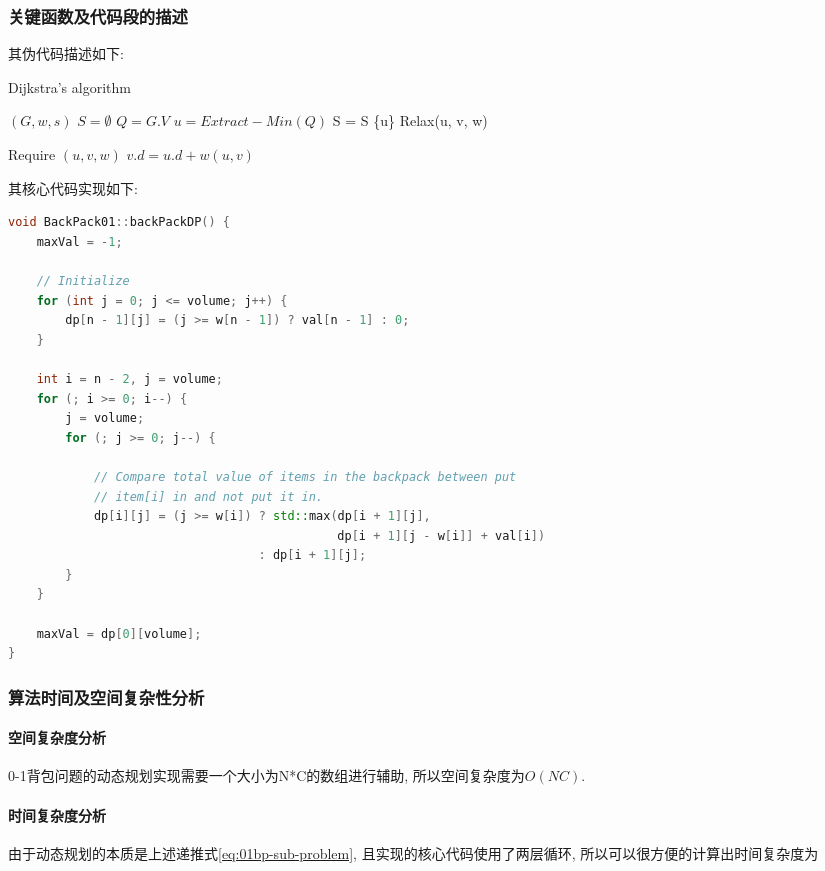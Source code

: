\subsubsection{关键函数及代码段的描述}
其伪代码描述如下:
\begin{algorithm}
	\caption{Dijkstra's algorithm}\label{alg:dijkstra}
	\begin{algorithmic}{1}
		\Require $(G, w, s)$
		\State $S = \emptyset$
		\State $Q = G.V$
		\State $u = Extract-Min(Q)$
		\State S = S \cup \{u\}
		\State Relax(u, v, w)
		\EndFor
		\EndWhile
	\end{algorithmic}

	\begin{algorithmic}{1}
		Require $(u, v, w)$
		\State $v.d = u.d + w(u, v)$
		\EndIf
	\end{algorithmic}
\end{algorithm}

其核心代码实现如下:

\begin{lstlisting}[language=c++]
void BackPack01::backPackDP() {
    maxVal = -1;

    // Initialize
    for (int j = 0; j <= volume; j++) {
        dp[n - 1][j] = (j >= w[n - 1]) ? val[n - 1] : 0;
    }

    int i = n - 2, j = volume;
    for (; i >= 0; i--) {
        j = volume;
        for (; j >= 0; j--) {

            // Compare total value of items in the backpack between put
            // item[i] in and not put it in.
            dp[i][j] = (j >= w[i]) ? std::max(dp[i + 1][j],
                                              dp[i + 1][j - w[i]] + val[i])
                                   : dp[i + 1][j];
        }
    }

    maxVal = dp[0][volume];
}
\end{lstlisting}

\subsubsection{算法时间及空间复杂性分析}
\paragraph{空间复杂度分析}
0-1背包问题的动态规划实现需要一个大小为N*C的数组进行辅助,
所以空间复杂度为$O(NC)$.

\paragraph{时间复杂度分析}
由于动态规划的本质是上述递推式\ref{eq:01bp-sub-problem},
且实现的核心代码使用了两层循环, 所以可以很方便的计算出时间复杂度为

